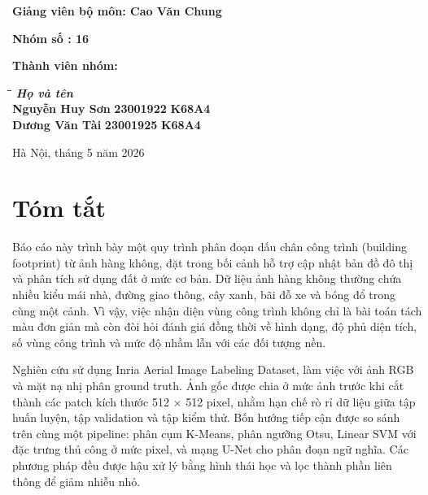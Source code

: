 \documentclass[12pt,a4paper]{report}
\begin{document}
\begin{titlepage}
\vspace{15pt}
{\fontsize{12pt}{15pt}\selectfont
\textbf{Giảng viên bộ môn: Cao Văn Chung}

\vspace{6pt}
\textbf{Nhóm số : 16}

\vspace{6pt}
\textbf{Thành viên nhóm:}

\vspace{5pt}
\begin{tabbing}
\hspace{0.5cm}\=\hspace{8cm}\=\hspace{3cm}\=\hspace{3cm} \kill
{\itshape\textbf{}}\>
{\itshape\textbf{Họ và tên}}\\
\>\textbf{Nguyễn Huy Sơn}\> \textbf{23001922}\> \textbf{K68A4}\\
\>\textbf{Dương Văn Tài}\> \textbf{23001925}\> \textbf{K68A4}\\
\end{tabbing}}

\vfill
\begin{center}
{\large Hà Nội, tháng 5 năm 2026}
\end{center}
\end{titlepage}

\tableofcontents
\clearpage
{}

\chapter*{Tóm tắt}

Báo cáo này trình bày một quy trình phân đoạn dấu chân công trình (building footprint) từ ảnh hàng không, đặt trong bối cảnh hỗ trợ cập nhật bản đồ đô thị và phân tích sử dụng đất ở mức cơ bản. Dữ liệu ảnh hàng không thường chứa nhiều kiểu mái nhà, đường giao thông, cây xanh, bãi đỗ xe và bóng đổ trong cùng một cảnh. Vì vậy, việc nhận diện vùng công trình không chỉ là bài toán tách màu đơn giản mà còn đòi hỏi đánh giá đồng thời về hình dạng, độ phủ diện tích, số vùng công trình và mức độ nhầm lẫn với các đối tượng nền.

Nghiên cứu sử dụng Inria Aerial Image Labeling Dataset, làm việc với ảnh RGB và mặt nạ nhị phân ground truth. Ảnh gốc được chia ở mức ảnh trước khi cắt thành các patch kích thước 512 $\times$ 512 pixel, nhằm hạn chế rò rỉ dữ liệu giữa tập huấn luyện, tập validation và tập kiểm thử. Bốn hướng tiếp cận được so sánh trên cùng một pipeline: phân cụm K-Means, phân ngưỡng Otsu, Linear SVM với đặc trưng thủ công ở mức pixel, và mạng U-Net cho phân đoạn ngữ nghĩa. Các phương pháp đều được hậu xử lý bằng hình thái học và lọc thành phần liên thông để giảm nhiễu nhỏ.
\end{document}
